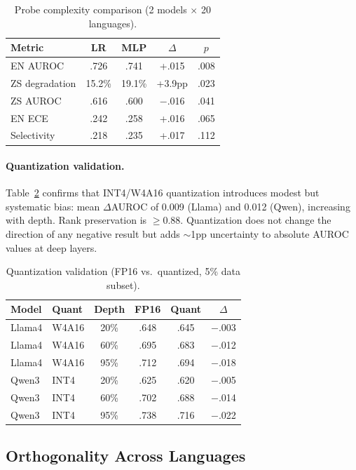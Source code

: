 \documentclass[11pt,a4paper]{article}
\newcommand{\auroc}{AUROC}
\newcommand{\ece}{ECE}
\begin{document}
\begin{table}[t]
\centering
\small
\caption{Probe complexity comparison (2 models $\times$ 20 languages).}
\label{tab:probe_complexity}
\begin{tabular}{lcccc}
\toprule
Metric & LR & MLP & $\Delta$ & $p$ \\
\midrule
EN \auroc{} & .726 & .741 & +.015 & .008 \\
ZS degradation & 15.2\% & 19.1\% & +3.9pp & .023 \\
ZS \auroc{} & .616 & .600 & $-$.016 & .041 \\
EN \ece{} & .242 & .258 & +.016 & .065 \\
Selectivity & .218 & .235 & +.017 & .112 \\
\bottomrule
\end{tabular}
\end{table}

\paragraph{Quantization validation.}
Table~\ref{tab:quantization} confirms that INT4/W4A16 quantization introduces modest but systematic bias: mean $\Delta$\auroc{} of 0.009 (Llama) and 0.012 (Qwen), increasing with depth.
Rank preservation is $\geq 0.88$.
Quantization does not change the direction of any negative result but adds $\sim$1pp uncertainty to absolute \auroc{} values at deep layers.

\begin{table}[t]
\centering
\small
\caption{Quantization validation (FP16 vs.\ quantized, 5\% data subset).}
\label{tab:quantization}
\begin{tabular}{llcccc}
\toprule
Model & Quant & Depth & FP16 & Quant & $\Delta$ \\
\midrule
Llama4 & W4A16 & 20\% & .648 & .645 & $-$.003 \\
Llama4 & W4A16 & 60\% & .695 & .683 & $-$.012 \\
Llama4 & W4A16 & 95\% & .712 & .694 & $-$.018 \\
\midrule
Qwen3 & INT4 & 20\% & .625 & .620 & $-$.005 \\
Qwen3 & INT4 & 60\% & .702 & .688 & $-$.014 \\
Qwen3 & INT4 & 95\% & .738 & .716 & $-$.022 \\
\bottomrule
\end{tabular}
\end{table}

\subsection{Orthogonality Across Languages}
\label{sec:orthogonality}
\end{document}
